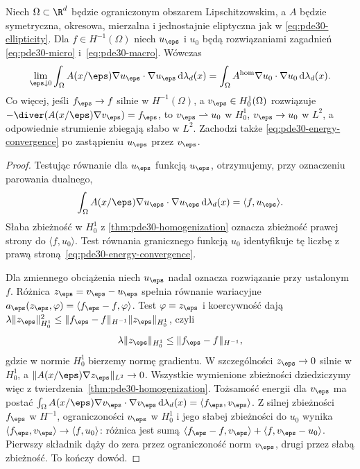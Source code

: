\begin{twierdzenie}
\label{thm:pde30-energy-convergence}
Niech $\Omega\subset\R^d$ będzie ograniczonym obszarem
Lipschitzowskim, a $A$ będzie symetryczna, okresowa,
mierzalna i jednostajnie eliptyczna jak w
\eqref{eq:pde30-ellipticity}. Dla $f\in H^{-1}(\Omega)$
niech $u_\eps$ i $u_0$ będą rozwiązaniami zagadnień
\eqref{eq:pde30-micro} i~\eqref{eq:pde30-macro}.
Wówczas
\begin{equation}\label{eq:pde30-energy-convergence}
 \lim_{\eps\downarrow0}\int_\Omega
 A(x/\eps)\nabla u_\eps\cdot\nabla u_\eps
 \,\mathrm d\lambda_d(x)
 =\int_\Omega A^{\mathrm{hom}}\nabla u_0\cdot\nabla u_0
 \,\mathrm d\lambda_d(x).
\end{equation}
Co więcej, jeśli $f_\eps\to f$ silnie w $H^{-1}(\Omega)$,
a $v_\eps\in H_0^1(\Omega)$ rozwiązuje
$-\diver(A(x/\eps)\nabla v_\eps)=f_\eps$,
to $v_\eps\rightharpoonup u_0$ w $H_0^1$,
$v_\eps\to u_0$ w $L^2$, a odpowiednie strumienie
zbiegają słabo w $L^2$. Zachodzi także
\eqref{eq:pde30-energy-convergence} po zastąpieniu
$u_\eps$ przez $v_\eps$.
\end{twierdzenie}
\begin{proof}
Testując równanie dla $u_\eps$ funkcją $u_\eps$,
otrzymujemy, przy oznaczeniu parowania dualnego,
\[
 \int_\Omega A(x/\eps)\nabla u_\eps\cdot\nabla u_\eps
 \,\mathrm d\lambda_d(x)=\langle f,u_\eps\rangle.
\]
Słaba zbieżność w $H_0^1$ z
\ref{thm:pde30-homogenization} oznacza zbieżność
prawej strony do $\langle f,u_0\rangle$.
Test równania granicznego funkcją $u_0$ identyfikuje
tę liczbę z prawą stroną~\eqref{eq:pde30-energy-convergence}.

Dla zmiennego obciążenia niech $u_\eps$ nadal oznacza
rozwiązanie przy ustalonym $f$. Różnica
$z_\eps=v_\eps-u_\eps$ spełnia równanie wariacyjne
$a_\eps(z_\eps,\varphi)=\langle f_\eps-f,\varphi\rangle$.
Test $\varphi=z_\eps$ i koercywność dają
$\lambda\|z_\eps\|_{H_0^1}^2\le
\|f_\eps-f\|_{H^{-1}}\|z_\eps\|_{H_0^1}$, czyli
\[
 \lambda\|z_\eps\|_{H_0^1}\le
 \|f_\eps-f\|_{H^{-1}},
\]
gdzie w normie $H_0^1$ bierzemy normę gradientu.
W szczególności $z_\eps\to0$ silnie w $H_0^1$,
a $\|A(x/\eps)\nabla z_\eps\|_{L^2}\to0$.
Wszystkie wymienione zbieżności dziedziczymy więc
z twierdzenia~\ref{thm:pde30-homogenization}.
Tożsamość energii dla $v_\eps$ ma postać
$\int_\Omega A(x/\eps)\nabla v_\eps\cdot\nabla v_\eps\,\mathrm d\lambda_d(x)
=\langle f_\eps,v_\eps\rangle$.
Z silnej zbieżności $f_\eps$ w $H^{-1}$,
ograniczoności $v_\eps$ w $H_0^1$ i jego słabej
zbieżności do $u_0$ wynika
$\langle f_\eps,v_\eps\rangle\to\langle f,u_0\rangle$:
różnica jest sumą
$\langle f_\eps-f,v_\eps\rangle+\langle f,v_\eps-u_0\rangle$.
Pierwszy składnik dąży do zera przez ograniczoność
norm $v_\eps$, drugi przez słabą zbieżność.
To kończy dowód.
\end{proof}

